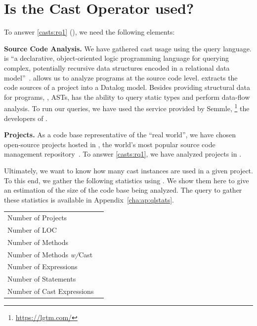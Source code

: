 \section{Is the Cast Operator used?}
\label{sec:casts:stats}



To answer \ref{casts:rq1} (\emph{\crqA}),
%
%
we need the following elements:

\textbf{Source Code Analysis.}
We have gathered cast usage using the \ql{} query language.
\ql{} is ``a declarative, object-oriented logic programming language for querying complex, potentially recursive data structures encoded in a relational data model''~\citep{avgustinovQLObjectorientedQueries2016}.
\ql{} allows us to analyze programs at the source code level.
\ql{} extracts the code sources of a project into a Datalog model.
Besides providing structural data for programs, \ie{}, ASTs,
\ql{} has the ability to query static types and perform data-flow analysis.
To run our \ql{} queries,
we have used the service provided by Semmle,%
\footnote{\url{https://lgtm.com/}} 
%
%
the developers of \ql{}.

\textbf{Projects.} 
As a code base representative of the ``real world'',
we have chosen open-source projects hosted in \github{},
the world's most popular source code
%
%
management repository~\citep{gousiosLeanGHTorrentGitHub2014}.
To answer \ref{casts:rq1},
%
%
we have analyzed \nproject{} \java{} projects in \lgtm{}.

Ultimately, we want to know how many cast instances are used in a given project.
To this end, we gather the following statistics using \ql{}.
We show them here to give an estimation of the size of the code base being analyzed.
The query to gather these statistics is available in Appendix~\ref{cha:ap:qlstats}.

\begin{center}
\begin{tabular}{lr}
	\hline
	Number of Projects 				& \nproject \\
	Number of LOC 					& \nloc{} \\
	Number of Methods 				& \nmethod \\
	Number of Methods \emph{w/}Cast	& \nmethodwithcast \\
    Number of Expressions			& \nexpr \\
    Number of Statements			& \nstmt \\
    Number of Cast Expressions		& \ncast \\
	\hline
\end{tabular}
\end{center}

